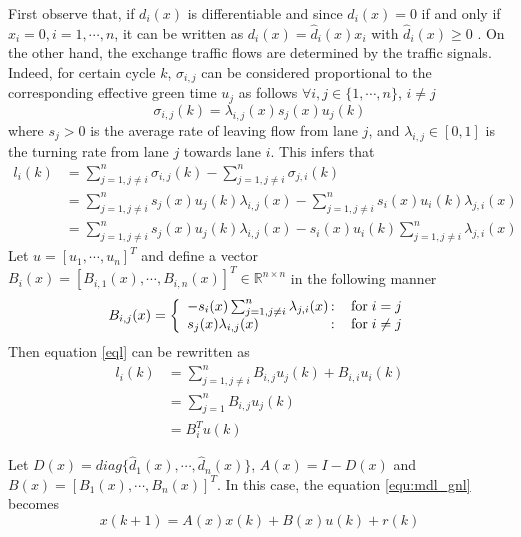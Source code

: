 \documentclass[trsc,nonblindrev]{informs3} %
\renewcommand{\vec}[1]{#1}
\newcommand{\mat}[1]{#1}
\begin{document}
First observe that, if $d_{i}(x)$ is differentiable and since
$d_{i}(x)=0$ if and only if $x_i=0, i=1,\cdots,n$, it can be written
as $d_{i}(x)=\hat{d}_{i}(x)x_i$ with $\hat{d}_{i}(x)\geq0$
\citep{Jacquez1993}.
On the other hand, the exchange traffic flows are determined by the
traffic signals. Indeed, for certain cycle $k$, $\sigma_{i,j}$ can be
considered proportional to the corresponding effective green time
$u_j$ as follows $\forall i,j\in\{1,\cdots,n\}$, $i\neq j$
\citep{papageorgiou_review_2003}
$$\sigma_{i,j}(k)=\lambda_{i,j}(x) s_j(x) u_j(k)$$
where $s_j>0$ is the average rate of leaving flow from lane $j$, and
$\lambda_{i,j}\in[0,1]$ is the turning rate from lane $j$ towards
lane $i$. This infers that
\begin{equation}
\label{eql}
\begin{split}
l_i(k)&=\sum_{j=1,j\neq i}^{n} \sigma_{i,j}(k)
         -\sum_{j=1,j\neq i}^{n} \sigma_{j,i}(k)\\
      &=\sum_{j=1,j\neq i}^{n} s_j(x) u_{j}(k) \lambda_{i,j}(x)
        -\sum_{j=1,j\neq i}^{n} s_i(x) u_{i}(k) \lambda_{j,i}(x)\\
      &=\sum_{j=1,j\neq i}^{n} s_j(x) u_{j}(k) \lambda_{i,j}(x)
        -s_i(x)u_{i}(k)\sum_{j=1,j\neq i}^{n}  \lambda_{j,i}(x)
\end{split}
\end{equation}
Let $\vec{u} = [u_1,\cdots,u_n]^T$ and define a vector
$\vec{B}_i(x)=[B_{i,1}(x),\cdots,B_{i,n}(x)]^T\in\mathbb{R}^{n\times
n}$ in the following manner
\begin{equation*}
 B_{i,j}(x)= \left\{ \begin{array}{l@{\,:\,}r}
            - s_i(x) \sum_{j=1,j\neq i}^{n}  \lambda_{j,i}(x)
            &\quad \text{for}\; i= j\\
              s_j(x) \lambda_{i,j}(x)&\quad
             \text{for}\;i\neq j
            \end{array}\right.
\end{equation*}
Then equation \eqref{eql} can be rewritten as
\begin{equation}
\label{equ:Con_li}
\begin{split}
l_i(k)&=\sum_{j=1,j\neq i}^{n} B_{i,j} u_{j}(k)
        +B_{i,i} u_{i}(k)\\
        &=\sum_{j=1}^{n} B_{i,j} u_{j}(k)\\
      &=\vec{B}_i^T\vec{u}(k)
\end{split}
\end{equation}

Let $\mat{D}(x)=diag\{\hat{d}_{1}(x),\cdots,\hat{d}_{n}(x)\}$,
$\mat{A}(x)=\mat{I}-\mat{D}(x)$ and $\mat{B}(x) =
[\vec{B}_1(x),\cdots,\vec{B}_n(x)]^T$. In this case, the equation
\eqref{equ:mdl_gnl} becomes
$$
\vec{x}(k+1)=\mat{A}(x)\vec{x}(k)+\mat{B}(x)\vec{u}(k)+\vec{r}(k)
$$
\end{document}
